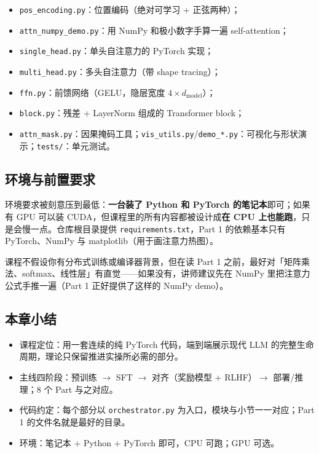 \begin{itemize}
\item \texttt{pos\_encoding.py}：位置编码（绝对可学习 + 正弦两种）；
\item \texttt{attn\_numpy\_demo.py}：用 NumPy 和极小数字手算一遍 self-attention；
\item \texttt{single\_head.py}：单头自注意力的 PyTorch 实现；
\item \texttt{multi\_head.py}：多头自注意力（带 shape tracing）；
\item \texttt{ffn.py}：前馈网络（GELU，隐层宽度 $4\times d_{\text{model}}$）；
\item \texttt{block.py}：残差 + LayerNorm 组成的 Transformer block；
\item \texttt{attn\_mask.py}：因果掩码工具；\texttt{vis\_utils.py}/\texttt{demo\_*.py}：可视化与形状演示；\texttt{tests/}：单元测试。
\end{itemize}

\subsection{环境与前置要求}

环境要求被刻意压到最低：\textbf{一台装了 Python 和 PyTorch 的笔记本}即可；如果有 GPU 可以装 CUDA，但课程里的所有内容都被设计成\textbf{在 CPU 上也能跑}，只是会慢一点。仓库根目录提供 \texttt{requirements.txt}，Part 1 的依赖基本只有 PyTorch、NumPy 与 matplotlib（用于画注意力热图）。

课程不假设你有分布式训练或编译器背景，但在读 Part 1 之前，最好对「矩阵乘法、softmax、线性层」有直觉——如果没有，讲师建议先在 NumPy 里把注意力公式手推一遍（Part 1 正好提供了这样的 NumPy demo）。

\subsection{本章小结}
\begin{itemize}
\item 课程定位：用一套连续的纯 PyTorch 代码，端到端展示现代 LLM 的完整生命周期，理论只保留推进实操所必需的部分。
\item 主线四阶段：预训练 $\rightarrow$ SFT $\rightarrow$ 对齐（奖励模型 + RLHF）$\rightarrow$ 部署/推理；8 个 Part 与之对应。
\item 代码约定：每个部分以 \texttt{orchestrator.py} 为入口，模块与小节一一对应；Part 1 的文件名就是最好的目录。
\item 环境：笔记本 + Python + PyTorch 即可，CPU 可跑；GPU 可选。
\end{itemize}

